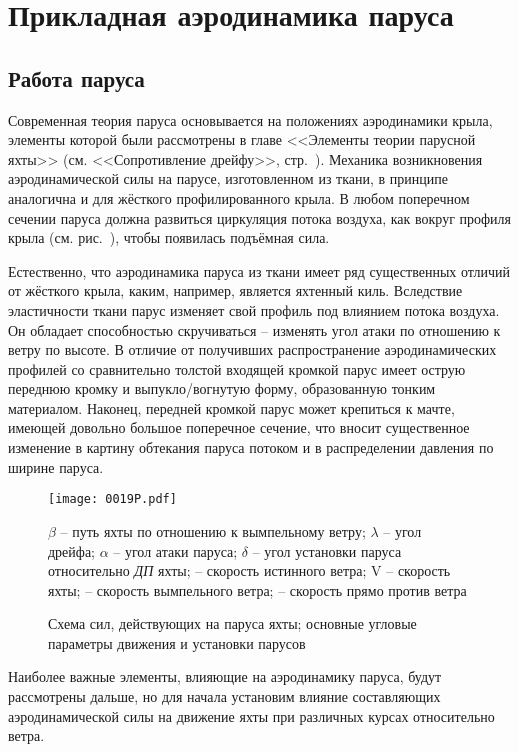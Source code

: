 \chapter{Прикладная аэродинамика паруса}\label{chap:2}

\section{Работа паруса}

Современная теория паруса основывается на положениях аэродинамики
крыла, элементы которой были рассмотрены в главе <<Элементы теории
парусной яхты>> (см. <<Сопротивление дрейфу>>,
стр.~\pageref{sec:drift_resistance}). Механика возникновения
аэродинамической силы на парусе, изготовленном из ткани, в принципе
аналогична и для жёсткого профилированного крыла. В любом поперечном
сечении паруса должна развиться циркуляция потока воздуха, как вокруг
профиля крыла (см. рис.~), чтобы появилась подъёмная сила.

Естественно, что аэродинамика паруса из ткани имеет ряд существенных
отличий от жёсткого крыла, каким, например, является яхтенный
киль. Вследствие эластичности ткани парус изменяет свой профиль под
влиянием потока воздуха. Он обладает способностью скручиваться \---
изменять угол атаки по отношению к ветру по высоте. В отличие от
получивших распространение аэродинамических профилей со сравнительно
толстой входящей кромкой парус имеет острую переднюю кромку и
выпукло\-/вогнутую форму, образованную тонким материалом. Наконец,
передней кромкой парус может крепиться к мачте, имеющей довольно
большое поперечное сечение, что вносит существенное изменение в
картину обтекания паруса потоком и в распределении давления по ширине
паруса.

\begin{figure}[htb]
  \centering
  \texttt{[image: 0019P.pdf]}
  \caption{Схема сил, действующих на паруса яхты; основные угловые параметры движения и установки парусов}
  \label{fig:19}
  \centering{}
  \small
  $\beta$ \--- путь яхты по отношению к вымпельному ветру; $\lambda$ \--- угол дрейфа; $\alpha$ \--- угол атаки паруса; $\delta$ \--- угол установки паруса относительно \textit{ДП} яхты;  \--- скорость истинного ветра; \ve V \--- скорость яхты;  \--- скорость вымпельного ветра;  \--- скорость прямо против ветра
\end{figure}

Наиболее важные элементы, влияющие на аэродинамику паруса, будут рассмотрены дальше, но для начала установим влияние составляющих аэродинамической силы на движение яхты при различных курсах относительно ветра.

